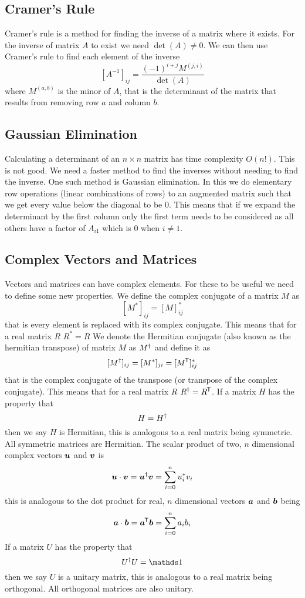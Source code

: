 \documentclass{article}
\begin{document}
    \subsection{Cramer's Rule}
    Cramer's rule is a method for finding the inverse of a matrix where it exists.
    For the inverse of matrix \(A\) to exist we need \(\det(A)\ne 0\).
    We can then use Cramer's rule to find each element of the inverse
    \[[A^{-1}]_{ij} = \frac{(-1)^{i + j}M^{(j,i)}}{\det(A)}\]
    where \(M^{(a,b)}\) is the minor of \(A\), that is the determinant of the matrix that results from removing row \(a\) and column \(b\).
    
    \subsection{Gaussian Elimination}
    Calculating a determinant of an \(n\times n\) matrix has time complexity \(O(n!)\). 
    This is not good. 
    We need a faster method to find the inverses without needing to find the inverse.
    One such method is Gaussian elimination.
    In this we do elementary row operations (linear combinations of rows) to an augmented matrix such that we get every value below the diagonal to be 0.
    This means that if we expand the determinant by the first column only the first term needs to be considered as all others have a factor of \(A_{i1}\) which is 0 when \(i \ne 1\).
    
    \subsection{Complex Vectors and Matrices}
    Vectors and matrices can have complex elements.
    For these to be useful we need to define some new properties.
    We define the complex conjugate of a matrix \(M\) as
    \[[M^*]_{ij} = [M]_{ij}^*\]
    that is every element is replaced with its complex conjugate.
    This means that for a real matrix \(R\) \(R^* = R\)
    We denote the Hermitian conjugate (also known as the hermitian transpose) of matrix \(M\) as \(M^\dagger\) and define it as
    \[[M^\dagger]_{ij} = [M^*]_{ji} = [M^{\mkern-1.5mu\mathsf{T}}]_{ij}^*\]
    that is the complex conjugate of the transpose (or transpose of the complex conjugate).
    This means that for a real matrix \(R\) \(R^\dagger = R^{\mkern-1.5mu\mathsf{T}}\).
    If a matrix \(H\) has the property that
    \[H = H^\dagger\]
    then we say \(H\) is Hermitian, this is analogous to a real matrix being symmetric. All symmetric matrices are Hermitian.
    The scalar product of two, \(n\) dimensional complex vectors \(\bm{u}\) and \(\bm{v}\) is
    \[\bm{u} \cdot \bm{v} = \bm{u}^\dagger \bm{v} = \sum_{i=0}^n u_i^*v_i\]
    this is analogous to the dot product for real, \(n\) dimensional vectors \(\bm{a}\) and \(\bm{b}\) being 
    \[\bm{a}\cdot \bm{b} = \bm{a}^{\mkern-1.5mu\mathsf{T}}\bm{b} = \sum_{i=0}^n a_ib_i\]
    If a matrix \(U\) has the property that
    \[U\hermit U = \ident\]
    then we say \(U\) is a unitary matrix, this is analogous to a real matrix being orthogonal. All orthogonal matrices are also unitary.
    
\end{document}

